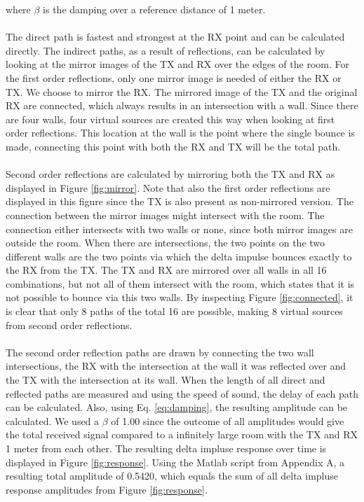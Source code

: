 \documentclass[final]{scrreprt} %
\begin{document}
where $\beta$ is the damping over a reference distance of 1 meter.
\\ \\
The direct path is fastest and strongest at the RX point and can be calculated directly.
The indirect paths, as a result of reflections, can be calculated by looking at the mirror images of the TX and RX over the edges of the room.
For the first order reflections, only one mirror image is needed of either the RX or TX.
We choose to mirror the RX.
The mirrored image of the TX and the original RX are connected, which always results in an intersection with a wall.
Since there are four walls, four virtual sources are created this way when looking at first order reflections.
This location at the wall is the point where the single bounce is made, connecting this point with both the RX and TX will be the total path.
\\ \\
Second order reflections are calculated by mirroring both the TX and RX as displayed in Figure \ref{fig:mirror}.
Note that also the first order reflections are displayed in this figure since the TX is also present as non-mirrored version.
The connection between the mirror images might intersect with the room.
The connection either intersects with two walls or none, since both mirror images are outside the room.
When there are intersections, the two points on the two different walls are the two points via which the delta impulse bounces exactly to the RX from the TX.
The TX and RX are mirrored over all walls in all 16 combinations, but not all of them intersect with the room, which states that it is not possible to bounce via this two walls.
By inspecting Figure \ref{fig:connected}, it is clear that only 8 paths of the total 16 are possible, making 8 virtual sources from second order reflections.
\\ \\
The second order reflection paths are drawn by connecting the two wall intersections, the RX with the intersection at the wall it was reflected over and the TX with the intersection at its wall.
When the length of all direct and reflected paths are measured and using the speed of sound, the delay of each path can be calculated.
Also, using Eq. \ref{eq:damping}, the resulting amplitude can be calculated.
We used a $\beta$ of 1.00 since the outcome of all amplitudes would give the total received signal compared to a infinitely large room with the TX and RX 1 meter from each other.
The resulting delta impluse response over time is displayed in Figure \ref{fig:response}.
Using the Matlab script from Appendix A, a resulting total amplitude of 0.5420, which equals the sum of all delta impluse response amplitudes from Figure \ref{fig:response}.
\end{document}
